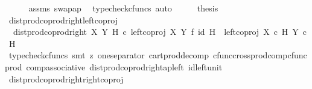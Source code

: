 \begin{isabellebody}
\ \ \ \ \isamarkupfalse%
\ assms\ swap{\isacharunderscore}{\kern0pt}ap\ \isamarkupfalse%
\ {\isacharparenleft}{\kern0pt}typecheck{\isacharunderscore}{\kern0pt}cfuncs{\isacharcomma}{\kern0pt}\ auto{\isacharparenright}{\kern0pt}\isanewline
\ \ \isamarkupfalse%
\ \isamarkupfalse%
\ {\isacharquery}{\kern0pt}thesis\isacommand{{\isachardot}{\kern0pt}}\isamarkupfalse%
\isanewline
{}\isamarkupfalse%
%
\endisatagproof
{\isafoldproof}%
%
\isadelimproof
\isanewline
%
\endisadelimproof
\isanewline
{}\isamarkupfalse%
\ dist{\isacharunderscore}{\kern0pt}prod{\isacharunderscore}{\kern0pt}coprod{\isacharunderscore}{\kern0pt}right{\isacharunderscore}{\kern0pt}left{\isacharunderscore}{\kern0pt}coproj{\isacharcolon}{\kern0pt}\isanewline
\ \ {\isachardoublequoteopen}dist{\isacharunderscore}{\kern0pt}prod{\isacharunderscore}{\kern0pt}coprod{\isacharunderscore}{\kern0pt}right\ X\ Y\ H\ {\isasymcirc}\isactrlsub c\ {\isacharparenleft}{\kern0pt}left{\isacharunderscore}{\kern0pt}coproj\ X\ Y\ {\isasymtimes}\isactrlsub f\ id\ H{\isacharparenright}{\kern0pt}\ {\isacharequal}{\kern0pt}\ left{\isacharunderscore}{\kern0pt}coproj\ {\isacharparenleft}{\kern0pt}X\ {\isasymtimes}\isactrlsub c\ H{\isacharparenright}{\kern0pt}\ {\isacharparenleft}{\kern0pt}Y\ {\isasymtimes}\isactrlsub c\ H{\isacharparenright}{\kern0pt}{\isachardoublequoteclose}\isanewline
%
\isadelimproof
\ \ %
\endisadelimproof
%
\isatagproof
{}\isamarkupfalse%
\ {\isacharparenleft}{\kern0pt}typecheck{\isacharunderscore}{\kern0pt}cfuncs{\isacharcomma}{\kern0pt}\ smt\ {\isacharparenleft}{\kern0pt}z{}{\isacharparenright}{\kern0pt}\ one{\isacharunderscore}{\kern0pt}separator\ cart{\isacharunderscore}{\kern0pt}prod{\isacharunderscore}{\kern0pt}decomp\ cfunc{\isacharunderscore}{\kern0pt}cross{\isacharunderscore}{\kern0pt}prod{\isacharunderscore}{\kern0pt}comp{\isacharunderscore}{\kern0pt}cfunc{\isacharunderscore}{\kern0pt}prod\ comp{\isacharunderscore}{\kern0pt}associative{}\ dist{\isacharunderscore}{\kern0pt}prod{\isacharunderscore}{\kern0pt}coprod{\isacharunderscore}{\kern0pt}right{\isacharunderscore}{\kern0pt}ap{\isacharunderscore}{\kern0pt}left\ id{\isacharunderscore}{\kern0pt}left{\isacharunderscore}{\kern0pt}unit{}{\isacharparenright}{\kern0pt}%
\endisatagproof
{\isafoldproof}%
%
\isadelimproof
\isanewline
%
\endisadelimproof
\isanewline
{}\isamarkupfalse%
\ dist{\isacharunderscore}{\kern0pt}prod{\isacharunderscore}{\kern0pt}coprod{\isacharunderscore}{\kern0pt}right{\isacharunderscore}{\kern0pt}right{\isacharunderscore}{\kern0pt}coproj{\isacharcolon}{\kern0pt}\isanewline

\end{isabellebody}
